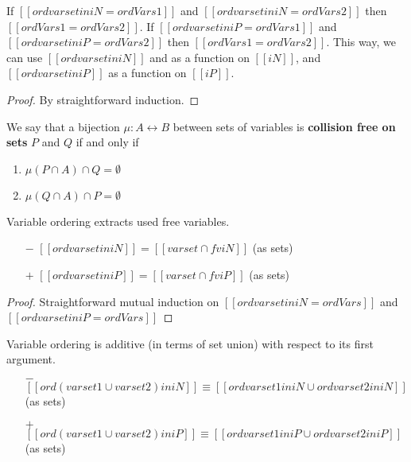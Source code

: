 \begin{observation}
  \label{obs:ord-deterministic}
  If $[[ord varset in iN = ordVars1]]$ and $[[ord varset in iN = ordVars2]]$ then $[[ordVars1 = ordVars2]]$.
  If $[[ord varset in iP = ordVars1]]$ and $[[ord varset in iP = ordVars2]]$ then $[[ordVars1 = ordVars2]]$.
  This way, we can use $[[ord varset in iN]]$ and as a function on $[[iN]]$,
  and $[[ord varset in iP]]$ as a function on $[[iP]]$.
\end{observation}
\begin{proof}
  By straightforward induction.
\end{proof}


\begin{definition} 
  We say that a bijection $\mu : A \leftrightarrow B$ between sets of
  variables is \textbf{collision free on sets} $P$ and $Q$ if and only if
  \begin{enumerate}
    \item $\mu(P \cap A) \cap Q = \emptyset$
    \item $\mu(Q \cap A) \cap P = \emptyset$
  \end{enumerate}
\end{definition}


\begin{lemma}
  \label{lemma:ord-soundness}
  Variable ordering extracts used free variables.
  \begin{itemize}
    \item[$-$] $[[ {ord varset in iN} ]] = [[varset ∩ fv iN]]$ (as sets)
    \item[$+$] $[[ {ord varset in iP} ]] = [[varset ∩ fv iP]]$ (as sets)
  \end{itemize}
\end{lemma}
\begin{proof}
  Straightforward mutual induction on 
  $[[ ord varset in iN = ordVars ]]$ and $[[ ord varset in iP = ordVars ]]$
\end{proof}


\begin{corollary}
  \label{corollary:ord-additivity}
  Variable ordering is additive (in terms of set union) with respect to its first argument.
  \begin{itemize}
    \item[$-$] $[[ {ord (varset1 ∪ varset2) in iN} ]]
                \equiv
                [[{ord varset1 in iN} ∪ {ord varset2 in iN}]]$ (as sets)
    \item[$+$] $[[{ord (varset1 ∪ varset2) in iP}]]
                \equiv
                [[{ord varset1 in iP} ∪ {ord varset2 in iP}]]$ (as sets)

  \end{itemize}
\end{corollary}

